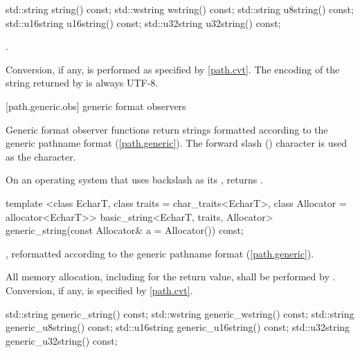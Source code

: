 %
%
%
%
%
\begin{itemdecl}
std::string string() const;
std::wstring wstring() const;
std::string u8string() const;
std::u16string u16string() const;
std::u32string u32string() const;
\end{itemdecl}

\begin{itemdescr}
\pnum
\returns {}.

\pnum
\remarks Conversion, if any, is performed as specified
by \ref{path.cvt}.
The encoding of the string returned by  is always UTF-8.
\end{itemdescr}


[path.generic.obs]{ generic format observers}

\pnum
Generic format observer functions return strings formatted according to the
generic pathname format (\ref{path.generic}).
The forward slash () character is used as
the  character.

\pnum
\begin{example} On an operating system that uses backslash as
its , 
returns . \end{example}

%
\begin{itemdecl}
template <class EcharT, class traits = char_traits<EcharT>,
          class Allocator = allocator<EcharT>>
  basic_string<EcharT, traits, Allocator>
    generic_string(const Allocator& a = Allocator()) const;
\end{itemdecl}

\begin{itemdescr}
\pnum
\returns {}, reformatted according to the generic
pathname format (\ref{path.generic}).

\pnum
\remarks All memory allocation, including for the return value, shall
be performed by . Conversion, if any, is specified by
\ref{path.cvt}.
\end{itemdescr}

%
%
%
%
%
\begin{itemdecl}
std::string generic_string() const;
std::wstring generic_wstring() const;
std::string generic_u8string() const;
std::u16string generic_u16string() const;
std::u32string generic_u32string() const;
\end{itemdecl}

